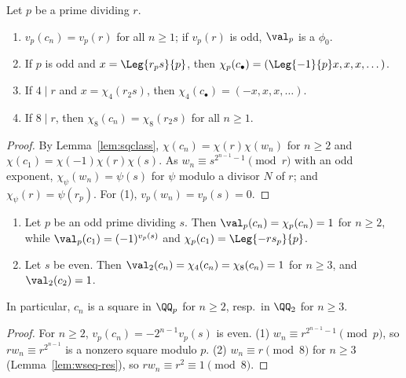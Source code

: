 \begin{lemma}[Primes of $r$]
  \label{lem:pat-r}
  \leanok
  Let $p$ be a prime dividing $r$.
  \begin{enumerate}
    \item $v_p(c_n) = v_p(r)$ for all $n \ge 1$; if $v_p(r)$ is odd, $\val_p$ is a $\phi_0$.
    \item If $p$ is odd and $x = \Leg{r_p s}{p}$, then
          $\chi_p(c_\bullet) = (\Leg{-1}{p} x, x, x, \dots)$.
    \item If $4 \mid r$ and $x = \chi_4(r_2 s)$, then $\chi_4(c_\bullet) = (-x, x, x, \dots)$.
    \item If $8 \mid r$, then $\chi_8(c_n) = \chi_8(r_2 s)$ for all $n \ge 1$.
  \end{enumerate}
\end{lemma}
\begin{proof}
  \leanok
  By Lemma~\ref{lem:sqclass}, $\chi(c_n) = \chi(r)\chi(w_n)$ for $n \ge 2$ and
  $\chi(c_1) = \chi(-1)\chi(r)\chi(s)$. As $w_n \equiv s^{2^{n-1}-1} \pmod r$ with an odd
  exponent, $\chi_\psi(w_n) = \psi(s)$ for $\psi$ modulo a divisor $N$ of $r$; and
  $\chi_\psi(r) = \psi(r_p)$. For (1), $v_p(w_n) = v_p(s) = 0$.
\end{proof}

\begin{lemma}[Primes of $s$]
  \label{lem:pat-s}
  \leanok
  \begin{enumerate}
    \item Let $p$ be an odd prime dividing $s$. Then $\val_p(c_n) = \chi_p(c_n) = 1$ for $n \ge 2$,
          while $\val_p(c_1) = (-1)^{v_p(s)}$ and $\chi_p(c_1) = \Leg{-r s_p}{p}$.
    \item Let $s$ be even. Then $\val_2(c_n) = \chi_4(c_n) = \chi_8(c_n) = 1$ for $n \ge 3$, and
          $\val_2(c_2) = 1$.
  \end{enumerate}
  In particular, $c_n$ is a square in $\QQ_p$ for $n \ge 2$, resp.\ in $\QQ_2$ for $n \ge 3$.
\end{lemma}
\begin{proof}
  \leanok
  For $n \ge 2$, $v_p(c_n) = -2^{n-1} v_p(s)$ is even. (1) $w_n \equiv r^{2^{n-1}-1} \pmod p$, so
  $r w_n \equiv r^{2^{n-1}}$ is a nonzero square modulo $p$. (2) $w_n \equiv r \pmod 8$ for
  $n \ge 3$ (Lemma~\ref{lem:wseq-res}), so $r w_n \equiv r^2 \equiv 1 \pmod 8$.
\end{proof}


